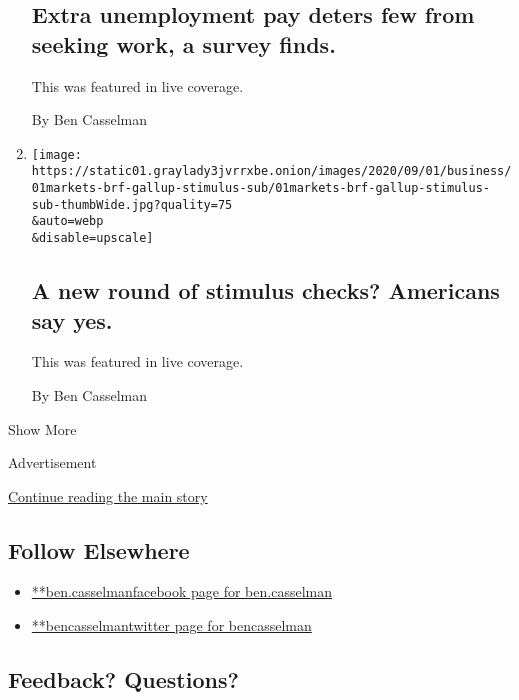 \begin{enumerate}
  \hypertarget{extra-unemployment-pay-deters-few-from-seeking-work-a-survey-finds}{%
  \subsection{Extra unemployment pay deters few from seeking work, a
  survey
  finds.}\label{extra-unemployment-pay-deters-few-from-seeking-work-a-survey-finds}}

  This was featured in live coverage.

  By Ben Casselman
\item
  \href{/live/2020/09/01/business/stock-market-today-coronavirus/a-new-round-of-stimulus-checks-americans-say-yes}{}

  \texttt{[image: https://static01.graylady3jvrrxbe.onion/images/2020/09/01/business/01markets-brf-gallup-stimulus-sub/01markets-brf-gallup-stimulus-sub-thumbWide.jpg?quality=75\\\&auto=webp\\\&disable=upscale]}

  \hypertarget{a-new-round-of-stimulus-checks-americans-say-yes}{%
  \subsection{A new round of stimulus checks? Americans say
  yes.}\label{a-new-round-of-stimulus-checks-americans-say-yes}}

  This was featured in live coverage.

  By Ben Casselman
\end{enumerate}

Show More

Advertisement

\protect\hyperlink{after-mid2}{Continue reading the main story}

\hypertarget{follow-elsewhere}{%
\subsection{Follow Elsewhere}\label{follow-elsewhere}}

\begin{itemize}
\tightlist
\item
  \href{https://www.facebookcorewwwi.onion/ben.casselman}{**ben.casselmanfacebook
  page for ben.casselman}
\item
  \href{https://twitter.com/bencasselman}{**bencasselmantwitter page for
  bencasselman}
\end{itemize}

\hypertarget{feedback-questions}{%
\subsection{Feedback? Questions?}\label{feedback-questions}}


